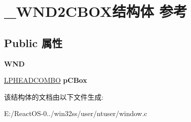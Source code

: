 \hypertarget{struct___w_n_d2_c_b_o_x}{}\section{\+\_\+\+W\+N\+D2\+C\+B\+O\+X结构体 参考}
\label{struct___w_n_d2_c_b_o_x}
\subsection*{Public 属性}
\begin{DoxyCompactItemize}
\item 
\mbox{\label{struct___w_n_d2_c_b_o_x_a6f267f5487eeaa788c2318d04572ccfc}} 
{\bfseries W\+ND}
\item 
\mbox{\label{struct___w_n_d2_c_b_o_x_a9ee1d9978e68ebe5ca6a79b2b3102619}} 
\hyperlink{struct_h_e_a_d_c_o_m_b_o}{L\+P\+H\+E\+A\+D\+C\+O\+M\+BO} {\bfseries p\+C\+Box}
\end{DoxyCompactItemize}


该结构体的文档由以下文件生成\+:\begin{DoxyCompactItemize}
\item 
E\+:/\+React\+O\+S-\/0../win32ss/user/ntuser/window.\+c\end{DoxyCompactItemize}

